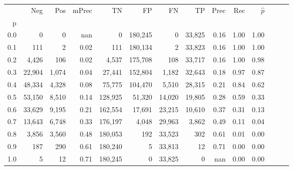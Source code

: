 \begin{tabular}{rrrrrrrrrrrrrr}
\toprule
{} &     Neg &    Pos & mPrec &       TN &       FP &      FN &      TP &  Prec &   Rec & $\hat{p}$ \\
p   &         &        &       &          &          &         &         &       &       &           \\
\midrule
0.0 &       0 &      0 &   nan &        0 &  180,245 &       0 &  33,825 &  0.16 &  1.00 &      1.00 \\
0.1 &     111 &      2 &  0.02 &      111 &  180,134 &       2 &  33,823 &  0.16 &  1.00 &      1.00 \\
0.2 &   4,426 &    106 &  0.02 &    4,537 &  175,708 &     108 &  33,717 &  0.16 &  1.00 &      0.98 \\
0.3 &  22,904 &  1,074 &  0.04 &   27,441 &  152,804 &   1,182 &  32,643 &  0.18 &  0.97 &      0.87 \\
0.4 &  48,334 &  4,328 &  0.08 &   75,775 &  104,470 &   5,510 &  28,315 &  0.21 &  0.84 &      0.62 \\
0.5 &  53,150 &  8,510 &  0.14 &  128,925 &   51,320 &  14,020 &  19,805 &  0.28 &  0.59 &      0.33 \\
0.6 &  33,629 &  9,195 &  0.21 &  162,554 &   17,691 &  23,215 &  10,610 &  0.37 &  0.31 &      0.13 \\
0.7 &  13,643 &  6,748 &  0.33 &  176,197 &    4,048 &  29,963 &   3,862 &  0.49 &  0.11 &      0.04 \\
0.8 &   3,856 &  3,560 &  0.48 &  180,053 &      192 &  33,523 &     302 &  0.61 &  0.01 &      0.00 \\
0.9 &     187 &    290 &  0.61 &  180,240 &        5 &  33,813 &      12 &  0.71 &  0.00 &      0.00 \\
1.0 &       5 &     12 &  0.71 &  180,245 &        0 &  33,825 &       0 &   nan &  0.00 &      0.00 \\
\bottomrule
\end{tabular}
